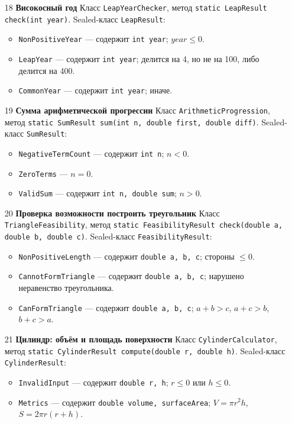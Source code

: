 \documentclass[12pt]{article}
\begin{document}
\begin{enumerate}
\item[18] \textbf{Високосный год}
Класс \texttt{LeapYearChecker}, метод
\texttt{static LeapResult check(int year)}.
Sealed-класс \texttt{LeapResult}:
\begin{itemize}
\item \texttt{NonPositiveYear} — содержит \texttt{int year}; \(year \leq 0\).
\item \texttt{LeapYear} — содержит \texttt{int year}; делится на 4, но не на 100, либо делится на 400.
\item \texttt{CommonYear} — содержит \texttt{int year}; иначе.
\end{itemize}

\item[19] \textbf{Сумма арифметической прогрессии}
Класс \texttt{ArithmeticProgression}, метод
\texttt{static SumResult sum(int n, double first, double diff)}.
Sealed-класс \texttt{SumResult}:
\begin{itemize}
\item \texttt{NegativeTermCount} — содержит \texttt{int n}; \(n < 0\).
\item \texttt{ZeroTerms} — \(n = 0\).
\item \texttt{ValidSum} — содержит \texttt{int n, double sum}; \(n > 0\).
\end{itemize}

\item[20] \textbf{Проверка возможности построить треугольник}
Класс \texttt{TriangleFeasibility}, метод
\texttt{static FeasibilityResult check(double a, double b, double c)}.
Sealed-класс \texttt{FeasibilityResult}:
\begin{itemize}
\item \texttt{NonPositiveLength} — содержит \texttt{double a, b, c}; стороны \(\leq 0\).
\item \texttt{CannotFormTriangle} — содержит \texttt{double a, b, c}; нарушено неравенство треугольника.
\item \texttt{CanFormTriangle} — содержит \texttt{double a, b, c}; \(a+b>c\), \(a+c>b\), \(b+c>a\).
\end{itemize}

\item[21] \textbf{Цилиндр: объём и площадь поверхности}
Класс \texttt{CylinderCalculator}, метод
\texttt{static CylinderResult compute(double r, double h)}.
Sealed-класс \texttt{CylinderResult}:
\begin{itemize}
\item \texttt{InvalidInput} — содержит \texttt{double r, h}; \(r \leq 0\) или \(h \leq 0\).
\item \texttt{Metrics} — содержит \texttt{double volume, surfaceArea}; \(V = \pi r^2 h\), \(S = 2\pi r(r + h)\).
\end{itemize}


\end{enumerate}
\end{document}
